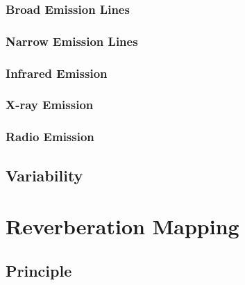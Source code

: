 \subsubsection{Broad Emission Lines}


\subsubsection{Narrow Emission Lines}


\subsubsection{Infrared Emission}


\subsubsection{X-ray Emission}


\subsubsection{Radio Emission}




\subsection{Variability}
\label{sec:variability}

\section{Reverberation Mapping}
\label{sec:reverberation_mapping}


\subsection{Principle}
\label{subsec:rm_principle}



